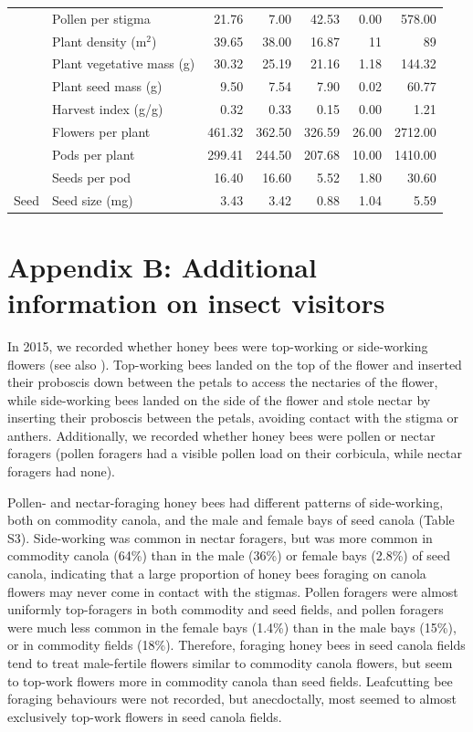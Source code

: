 \documentclass[12pt]{article} %
\begin{document}
\begin{table}[h]
\begin{tabular}{l|l|r|r|r|r|r}
\cline{2-7}
 & Pollen per stigma & 21.76 & 7.00 & 42.53 & 0.00 & 578.00\\
\cline{2-7}
 & Plant density (m$^2$) & 39.65 & 38.00 & 16.87 & 11 & 89\\
\cline{2-7}
 & Plant vegetative mass (g) & 30.32 & 25.19 & 21.16 & 1.18 & 144.32\\
\cline{2-7}
 & Plant seed mass (g) & 9.50 & 7.54 & 7.90 & 0.02 & 60.77\\
\cline{2-7}
 & Harvest index (g/g) & 0.32 & 0.33 & 0.15 & 0.00 & 1.21\\
\cline{2-7}
 & Flowers per plant & 461.32 & 362.50 & 326.59 & 26.00 & 2712.00\\
\cline{2-7}
 & Pods per plant & 299.41 & 244.50 & 207.68 & 10.00 & 1410.00\\
\cline{2-7}
 & Seeds per pod & 16.40 & 16.60 & 5.52 & 1.80 & 30.60\\
\cline{2-7}
\multirow{-15}{*}{\raggedright\arraybackslash Seed} & Seed size (mg) & 3.43 & 3.42 & 0.88 & 1.04 & 5.59\\
\hline
\end{tabular}
\end{table}

\clearpage

\section*{Appendix B: Additional information on insect visitors}

In 2015, we recorded whether honey bees were top-working or side-working flowers (see also \citealp{free1973, free1983, mohr1988}).
Top-working bees landed on the top of the flower and inserted their proboscis down between the petals to access the nectaries of the flower, while side-working bees landed on the side of the flower and stole nectar by inserting their proboscis between the petals, avoiding contact with the stigma or anthers. 
Additionally, we recorded whether honey bees were pollen or nectar foragers (pollen foragers had a visible pollen load on their corbicula, while nectar foragers had none).

Pollen- and nectar-foraging honey bees had different patterns of side-working, both on commodity canola, and the male and female bays of seed canola (Table S3).
Side-working was common in nectar foragers, but was more common in commodity canola (64\%) than in the male (36\%) or female bays (2.8\%) of seed canola, indicating that a large proportion of honey bees foraging on canola flowers may never come in contact with the stigmas.
Pollen foragers were almost uniformly top-foragers in both commodity and seed fields, and pollen foragers were much less common in the female bays (1.4\%) than in the male bays (15\%), or in commodity fields (18\%).
Therefore, foraging honey bees in seed canola fields tend to treat male-fertile flowers similar to commodity canola flowers, but seem to top-work flowers more in commodity canola than seed fields.
Leafcutting bee foraging behaviours were not recorded, but anecdoctally, most seemed to almost exclusively top-work flowers in seed canola fields.
\end{document}
